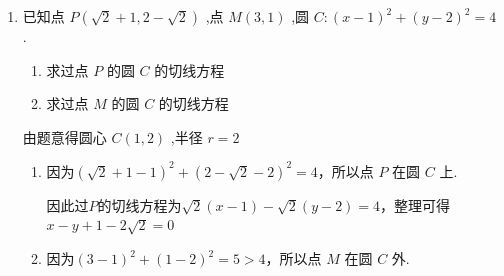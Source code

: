 \begin{enumerate}
\begin{jieda}
        所以直线 ${MN}$ 过定点 $A\left( {1,1}\right)$ ,
        
        因为 ${1}^{2} + {1}^{2} < 3$ ,即点 $A$ 在圆 ${x}^{2} + {y}^{2} = 3$ 内,
        
        圆 ${x}^{2} + {y}^{2} = 3$ 的圆心为原点 $O$ ,半径为 $\sqrt{3}$ ,
        
        当 ${OA} \bot  {MN}$ 时,圆心 $O$ 到直线 ${MN}$ 的距离取得最大值,
        
        此时 $\left| {MN}\right|$ 取最小值,故 ${\left| MN\right| }_{\min } = 2\sqrt{3 - {\left| OA\right| }^{2}} = 2$ .
    \end{jieda}
    \item 已知点 $P\left( {\sqrt{2} + 1,2 - \sqrt{2}}\right)$ ,点 $M\left( {3,1}\right)$ ,圆 $C : {\left( x - 1\right) }^{2} + {\left( y - 2\right) }^{2} = 4$ .
    \begin{enumerate}
        \item 求过点 $P$ 的圆 $C$ 的切线方程
        \item 求过点 $M$ 的圆 $C$ 的切线方程
    \end{enumerate}
    \begin{jieda}
        由题意得圆心 $C\left( {1,2}\right)$ ,半径 $r = 2$
        \begin{enumerate}
            \item 因为${\left( \sqrt{2} + 1 - 1\right) }^{2} + {\left( 2 - \sqrt{2} - 2\right) }^{2} = 4$，所以点 $P$ 在圆 $C$ 上.

            因此过$P$的切线方程为$\sqrt{2}\left( x - 1\right) -\sqrt{2}\left( y - 2\right) = 4$，整理可得$x - y + 1 - 2\sqrt{2} = 0$
            \item 因为${\left( 3 - 1\right) }^{2} + {\left( 1 - 2\right) }^{2} = 5 > 4$，所以点 $M$ 在圆 $C$ 外.
\end{enumerate}
\end{jieda}
\end{enumerate}
